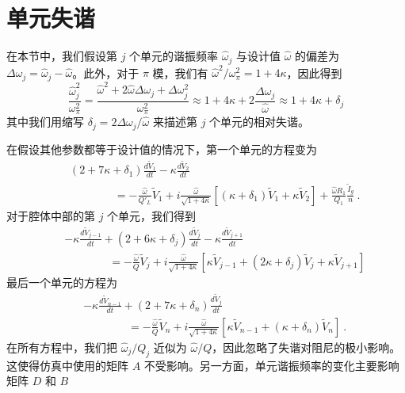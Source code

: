 \documentclass[12pt]{article}
\newcommand\tV{\tilde V}
\newcommand\ho{\hat\omega}
\newcommand\Do{\Delta\omega}
\begin{document}
\section{单元失谐}
\label{sec:omega}
%
在本节中，我们假设第 $j$ 个单元的谐振频率 $\ho_j$ 与设计值 $\ho$ 的偏差为 $\Do_j=\ho_j-\ho$。此外，对于 $\pi$ 模，我们有 $\ho^2/\omega^2_{\pi}=1+4\kappa$，因此得到
\begin{equation}
  \frac{\ho^2_j}{\omega_{\pi}^2}=\frac{\ho^2+2\ho\Do_j+\Do_j^2}{\omega_{\pi}^2}
  \approx 1+4\kappa+2\frac{\Do_j}{\ho}
  \approx 1+4\kappa + \delta_j
\end{equation}
其中我们用缩写 $\delta_j=2\Do_j/\ho$ 来描述第 $j$ 个单元的相对失谐。
\par
在假设其他参数都等于设计值的情况下，第一个单元的方程变为
\begin{eqnarray}\label{eq:c1td}
&&  \left(2+7\kappa+\delta_1\right)\frac{d\tV_1}{dt} -\kappa\frac{d\tV_2}{dt}\\
&&\qquad\qquad  =-\frac{\ho}{Q'_L}\tV_1
  +i\frac{\ho}{\sqrt{1+4\kappa}}\left[(\kappa+\delta_1)\tV_1+\kappa\tV_2\right]
  + \frac{\ho R_1}{Q_1}\frac{\tilde I_g}{n}\ .\nonumber
\end{eqnarray}
对于腔体中部的第 $j$ 个单元，我们得到
\begin{eqnarray}\label{eq:cjtd}
&&  -\kappa \frac{d\tV_{j-1}}{dt} +\left(2+6\kappa+\delta_j\right)\frac{d\tV_j}{dt}
     -\kappa \frac{d\tV_{j+1}}{dt}\\
  &&\qquad\qquad = -\frac{\ho}{Q}\tV_j+i\frac{\ho}{\sqrt{1+4\kappa}}
     \left[\kappa\tV_{j-1} +(2\kappa+\delta_j)\tV_j+\kappa\tV_{j+1} \right]
     \nonumber
\end{eqnarray}
最后一个单元的方程为
\begin{eqnarray}\label{eq:cntd}
  && -\kappa \frac{d\tV_{n-1}}{dt}+\left(2+7\kappa+\delta_n\right)\frac{d\tV_j}{dt}\\
  &&\qquad\qquad = -\frac{\ho}{Q}\tV_n +i\frac{\ho}{\sqrt{1+4\kappa}}
      \left[\kappa\tV_{n-1}+(\kappa+\delta_n)\tV_n\right]\ .\nonumber
\end{eqnarray}
在所有方程中，我们把 $\ho_j/Q_j$ 近似为 $\ho/Q$，因此忽略了失谐对阻尼的极小影响。这使得仿真中使用的矩阵 $A$ 不受影响。另一方面，单元谐振频率的变化主要影响矩阵 $D$ 和 $B$
\end{document}
